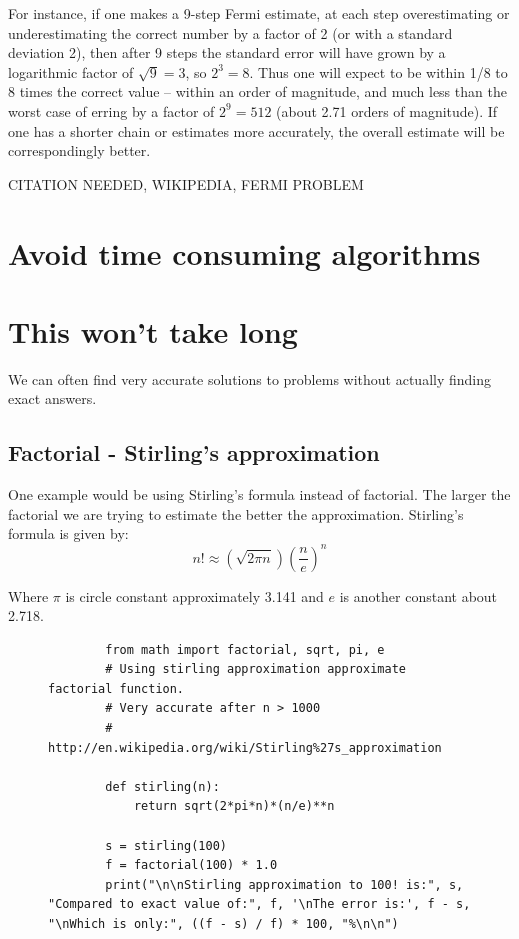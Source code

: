 \documentclass[pdftex, 12pt, a4paper]{report}
\begin{document}
	For instance, if one makes a 9-step Fermi estimate, at each step overestimating or underestimating the correct number by a factor of 2 (or with a standard deviation 2), then after 9 steps the standard error will have grown by a logarithmic factor of $\sqrt{9}=3$, so $2^3=8$. Thus one will expect to be within 1/8 to 8 times the correct value – within an order of magnitude, and much less than the worst case of erring by a factor of $2^9=512$ (about 2.71 orders of magnitude). If one has a shorter chain or estimates more accurately, the overall estimate will be correspondingly better. \par
	
	CITATION NEEDED, WIKIPEDIA, FERMI PROBLEM
	
	\section{Avoid time consuming algorithms}
	
	\section{This won't take long}
	
	We can often find very accurate solutions to problems without actually finding exact answers. 
	
	
	\subsection{Factorial - Stirling's approximation}
	
	One example would be using Stirling's formula instead of factorial. The larger the factorial we are trying to estimate the better the approximation. Stirling's formula is given by: $$n! \approx (\sqrt{2\pi n}) (\frac{n}{e})^n$$
	
	Where $\pi$ is circle constant approximately 3.141 and $e$ is another constant about 2.718.
	\begin{figure}[H]
	\begin{lstlisting}
		from math import factorial, sqrt, pi, e
		# Using stirling approximation approximate factorial function.
		# Very accurate after n > 1000
		# http://en.wikipedia.org/wiki/Stirling%27s_approximation
		
		def stirling(n):
			return sqrt(2*pi*n)*(n/e)**n
		
		s = stirling(100)
		f = factorial(100) * 1.0
		print("\n\nStirling approximation to 100! is:", s, "Compared to exact value of:", f, '\nThe error is:', f - s, "\nWhich is only:", ((f - s) / f) * 100, "%\n\n")
		
	\end{lstlisting}
	\end{figure}
	
\end{document}
